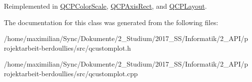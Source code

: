 Reimplemented in \hyperlink{class_q_c_p_color_scale_a259dcb6d3053a2cc3c197e9b1191ddbe}{Q\+C\+P\+Color\+Scale}, \hyperlink{class_q_c_p_axis_rect_add049d464b9ef2ccdc638adc4ccb4aca}{Q\+C\+P\+Axis\+Rect}, and \hyperlink{class_q_c_p_layout_a48ecc9c98ea90b547c3e27a931a8f7bd}{Q\+C\+P\+Layout}.



The documentation for this class was generated from the following files\+:\begin{DoxyCompactItemize}
\item 
/home/maximilian/\+Sync/\+Dokumente/2\+\_\+\+Studium/2017\+\_\+\+S\+S/\+Informatik/2\+\_\+\+A\+P\+I/projektarbeit-\/berdoullies/src/qcustomplot.\+h\item 
/home/maximilian/\+Sync/\+Dokumente/2\+\_\+\+Studium/2017\+\_\+\+S\+S/\+Informatik/2\+\_\+\+A\+P\+I/projektarbeit-\/berdoullies/src/qcustomplot.\+cpp\end{DoxyCompactItemize}

